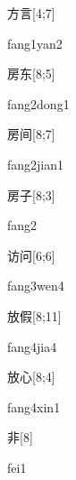 \begin{verbete}{方言}[4;7]
\begin{pronuncia}{fang1yan2}
\end{pronuncia}
\end{verbete}

\begin{verbete}{房东}[8;5]
\begin{pronuncia}{fang2dong1}
\end{pronuncia}
\end{verbete}

\begin{verbete}{房间}[8;7]
\begin{pronuncia}{fang2jian1}
\end{pronuncia}
\end{verbete}

\begin{verbete}[fang2]{房子}[8;3]
\begin{pronuncia}{fang2}
\end{pronuncia}
\end{verbete}

\begin{verbete}{访问}[6;6]
\begin{pronuncia}{fang3wen4}
\end{pronuncia}
\end{verbete}

\begin{verbete}{放假}[8;11]
\begin{pronuncia}{fang4jia4}
\end{pronuncia}
\end{verbete}

\begin{verbete}{放心}[8;4]
\begin{pronuncia}{fang4xin1}
\end{pronuncia}
\end{verbete}

\begin{verbete}[fei1]{非}[8]
\begin{pronuncia}{fei1}
\end{pronuncia}
\end{verbete}

